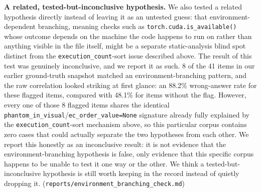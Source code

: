 \documentclass[11pt]{article}
\begin{document}
\textbf{A related, tested-but-inconclusive hypothesis.} We also tested a related hypothesis directly instead of leaving it as
an untested guess: that environment-dependent branching, meaning checks
such as \texttt{torch.cuda\allowbreak.is\_available\allowbreak()} whose
outcome depends on the machine the code happens to run on rather than
anything visible in the file itself, might be a separate static-analysis
blind spot distinct from the \texttt{execution\_count}-sort issue
described above. The result of this test was genuinely inconclusive, and
we report it as such. 8 of the 41 items in our earlier ground-truth
snapshot matched an environment-branching pattern, and the raw
correlation looked striking at first glance: an 88.2\% wrong-answer rate
for these flagged items, compared with 48.1\% for items without the flag.
However, every one of those 8 flagged items shares the identical
\texttt{phantom\_in\_visual}/\texttt{ec\_order\_value=None} signature
already fully explained by the \texttt{execution\_count}-sort mechanism
above, so this particular corpus contains zero cases that could actually
separate the two hypotheses from each other. We report this honestly as
an inconclusive result: it is not evidence that the environment-branching
hypothesis is false, only evidence that this specific corpus happens to
be unable to test it one way or the other. We think a tested-but-inconclusive
hypothesis is still worth keeping in the record instead of quietly
dropping it.
(\texttt{reports/environment\_branching\allowbreak\_check.md})
\end{document}
